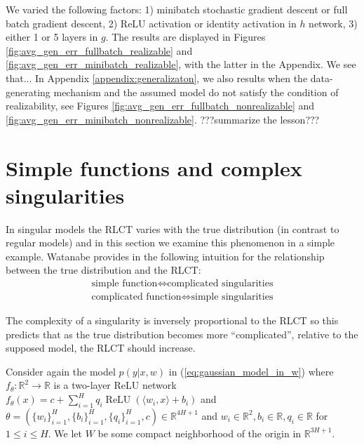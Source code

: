 \documentclass{article} %
\begin{document}
We varied the following factors: 1) minibatch stochastic gradient descent or full batch gradient descent, 2) ReLU activation or identity activation in $h$ network, 3) either 1 or 5 layers in $g$. 
The results are displayed in Figures \ref{fig:avg_gen_err_fullbatch_realizable} and \ref{fig:avg_gen_err_minibatch_realizable}, with the latter in the Appendix. We see that...
In Appendix \ref{appendix:generalizaton}, we also results when the data-generating mechanism and the assumed model do not satisfy the condition of realizability, see Figures \ref{fig:avg_gen_err_fullbatch_nonrealizable} and \ref{fig:avg_gen_err_minibatch_nonrealizable}. ???summarize the lesson???



\section{Simple functions and complex singularities}\label{section:simple_func}

In singular models the RLCT varies with the true distribution (in contrast to regular models) and in this section we examine this phenomenon in a simple example. Watanabe provides in \citep[\S 7.6]{watanabe_algebraic_2009} the following intuition for the relationship between the true distribution and the RLCT:
\begin{align*}
\text{simple function} \iff \text{complicated singularities}\\
\text{complicated function} \iff \text{simple singularities}
\end{align*}

The complexity of a singularity is inversely proportional to the RLCT so this predicts that as the true distribution becomes more ``complicated'', relative to the supposed model, the RLCT should increase. %

Consider again the model $p(y|x,w)$ in (\ref{eq:gaussian_model_in_w}) where $f_\theta: \mathbb{R}^2 \longrightarrow \mathbb{R}$ is a two-layer ReLU network
$
f_\theta(x) = c + \sum_{i=1}^H q_i \operatorname{ReLU}( \langle w_i, x \rangle + b_i )
$
and $\theta = (\{w_i\}_{i=1}^H, \{b_i\}_{i=1}^H, \{q_i\}_{i=1}^H, c) \in \mathbb{R}^{4H+1}$ and $w_i \in \mathbb{R}^2, b_i \in \mathbb{R}, q_i \in \mathbb{R}$ for $1 \le i \le H$. We let $W$ be some compact neighborhood of the origin in $\mathbb{R}^{3H+1}$.
\end{document}
